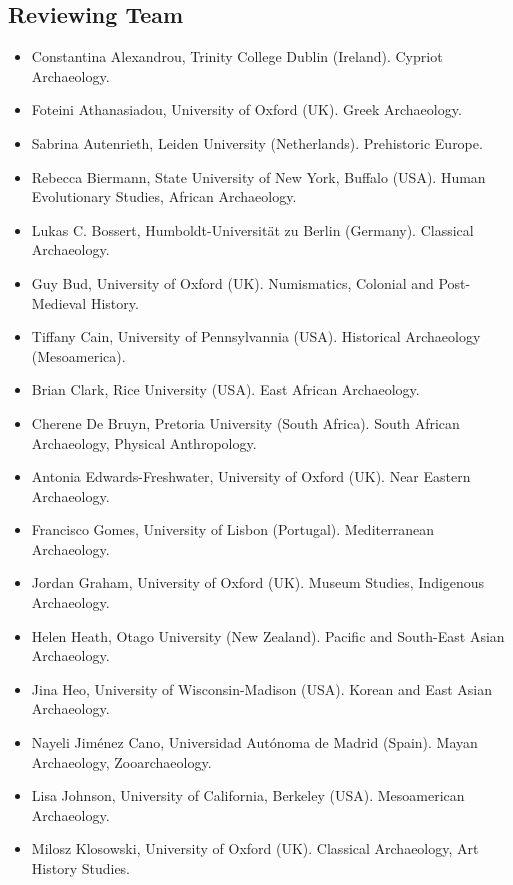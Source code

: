 \begin{footnotesize}
\section*{Reviewing Team}
\begin{multicols}{2}
\begin{itemize}
		\setlength{\itemsep}{0pt}%
		\setlength{\parskip}{0pt}%
		\setlength{\parsep}{0pt}%
\item Constantina Alexandrou, Trinity College Dublin (Ireland). Cypriot Archaeology.
\item Foteini Athanasiadou, University of Oxford (UK). Greek Archaeology.
\item Sabrina Autenrieth, Leiden University (Netherlands). Prehistoric Europe.
\item Rebecca Biermann, State University of New York, Buffalo (USA). Human Evolutionary Studies, African Archaeology.
\item Lukas C. Bossert, Humboldt-Universität zu Berlin (Germany). Classical Archaeology.
\item Guy Bud, University of Oxford (UK). Numismatics, Colonial and Post-Medieval History.
\item Tiffany Cain, University of Pennsylvannia (USA). Historical Archaeology (Mesoamerica).
\item Brian Clark, Rice University (USA). East African Archaeology.
\item Cherene De Bruyn, Pretoria University (South Africa). South African Archaeology, Physical Anthropology.
\item Antonia Edwards-Freshwater, University of Oxford (UK). Near Eastern Archaeology.
\item Francisco Gomes, University of Lisbon (Portugal). Mediterranean Archaeology.
\item Jordan Graham, University of Oxford (UK). Museum Studies, Indigenous Archaeology.
\item Helen Heath, Otago University (New Zealand). Pacific and South-East Asian Archaeology.
\item Jina Heo, University of Wisconsin-Madison (USA). Korean and East Asian Archaeology.
\item Nayeli Jiménez Cano, Universidad Autónoma de Madrid (Spain). Mayan Archaeology, Zooarchaeology.
\item Lisa Johnson, University of California, Berkeley (USA). Mesoamerican Archaeology.
\item Milosz Klosowski, University of Oxford (UK). Classical Archaeology, Art History Studies.

\end{itemize}
\end{multicols}
\end{footnotesize}
